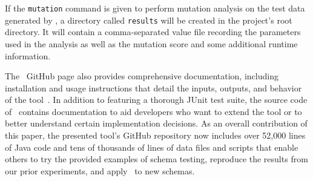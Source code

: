 If the \lstinline{mutation} command is given to perform mutation analysis on the test data generated by \sa, a directory
called \lstinline{results} will be created in the project's root directory. It will contain a comma-separated value file
recording the parameters used in the analysis as well as the mutation score and some additional runtime information.


The \sa~GitHub page also provides comprehensive documentation, including installation and usage instructions that detail
the inputs, outputs, and behavior of the tool~\cite{tool}. In addition to featuring a thorough JUnit test suite, the
source code of \sa~contains documentation to aid developers who want to extend the tool or to better understand certain
implementation decisions. As an overall contribution of this paper, the presented tool's GitHub repository now includes
over 52,000 lines of Java code and tens of thousands of lines of data files and scripts that enable others to try the
provided examples of schema testing, reproduce the results from our prior experiments, and apply \sa~to new schemas.



